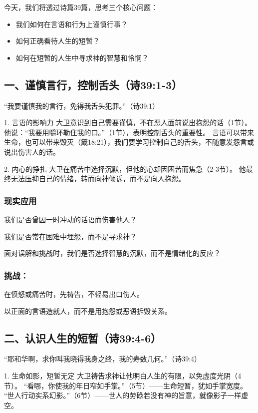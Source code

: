 \documentclass[a4paper, 12pt]{article}
\begin{document}
今天，我们将透过诗篇39篇，思考三个核心问题：
\begin{itemize}
    \item 我们如何在言语和行为上谨慎行事？

    \item 如何正确看待人生的短暂？

    \item 如何在短暂的人生中寻求神的智慧和怜悯？

\end{itemize}

\subsection*{一、谨慎言行，控制舌头（诗39:1-3）}
“我要谨慎我的言行，免得我舌头犯罪。”（诗39:1）

1. 言语的影响力
大卫意识到自己需要谨慎，不在恶人面前说出抱怨的话（1节）。
他说：“我要用嚼环勒住我的口。”（1节），表明控制舌头的重要性。
言语可以带来生命，也可以带来毁灭（箴18:21），我们要学习控制自己的舌头，不随意发怨言或说出伤害人的话。

2. 内心的挣扎
大卫在痛苦中选择沉默，但他的心却因困苦而焦急（2-3节）。
他最终无法压抑自己的情绪，转而向神倾诉，而不是向人抱怨。

\subsubsection*{现实应用}

\hspace{0.6cm}我们是否曾因一时冲动的话语而伤害他人？

我们是否常在困难中埋怨，而不是寻求神？

面对误解和挑战时，我们是否选择智慧的沉默，而不是情绪化的反应？

\subsubsection*{挑战：}

\hspace{0.6cm}在愤怒或痛苦时，先祷告，不轻易出口伤人。

以正面的言语造就人，而不是用抱怨或恶语拆毁关系。
\subsection*{二、认识人生的短暂（诗39:4-6）}
“耶和华啊，求你叫我晓得我身之终，我的寿数几何。”（诗39:4）

1. 生命如影，短暂无定
大卫祷告求神让他明白人生的有限，以免虚度光阴（4节）。
“看哪，你使我的年日窄如手掌。”（5节）——生命短暂，犹如手掌宽度。
“世人行动实系幻影。”（6节）——世人的劳碌若没有神的旨意，就像影子一样虚空。
\end{document}
